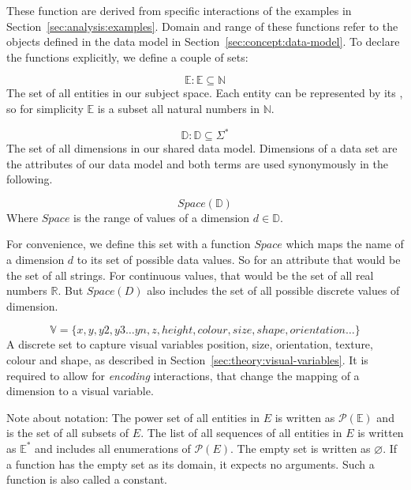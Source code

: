 \documentclass{article}
\newcommand{\attr}[1]{\texttt{\detokenize{#1}}}
\begin{document}
These function are derived from specific interactions of the examples in Section~\ref{sec:analysis:examples}.
Domain and range of these functions refer to the objects defined in the data model in Section~\ref{sec:concept:data-model}.
To declare the functions explicitly, we define a couple of sets:

\begin{equation} \mathbb{E} : \mathbb{E} \subseteq \mathbb{N}  \end{equation}
  The set of all entities in our subject space.
  Each entity can be represented by its \attr{id}, so for simplicity $\mathbb{E}$ is a subset all natural numbers in $\mathbb{N}$.

\begin{equation} \mathbb{D} : \mathbb{D} \subseteq \Sigma^* \end{equation}
  The set of all dimensions in our shared data model.
  Dimensions of a data set are the attributes of our data model and both terms are used synonymously in the following.

\begin{equation} Space(\mathbb{D}) \end{equation}
  Where $Space$ is the range of values of a dimension $d \in \mathbb{D}$.

  For convenience, we define this set with a function $Space$ which maps the name of a dimension $d$ to its set of possible data values.
  So for an attribute \attr{name} that would be the set of all strings.
  For continuous values, that would be the set of all real numbers $\mathbb{R}$.
  But $Space(D)$ also includes the set of all possible discrete values of dimension. 

\begin{equation} \mathbb{V} = \{x,y,y2,y3\ldots{}yn,z,height,colour,size,shape,orientation\ldots{}\} \end{equation}
  A discrete set to capture visual variables position, size, orientation, texture, colour and shape, as described in Section~\ref{sec:theory:visual-variables}.
  It is required to allow for \emph{encoding} interactions, that change the mapping of a dimension to a visual variable.

Note about notation:
The power set of all entities in $E$ is written as $ \mathcal{P}(\mathbb{E})$ and is the set of all subsets of $E$.
The list of all sequences of all entities in $E$ is written as $ \mathbb{E^*} $ and includes all enumerations of $\mathcal{P}(E)$.
The empty set is written as $\varnothing$.
If a function has the empty set as its domain, it expects no arguments.
Such a function is also called a constant.
\end{document}
